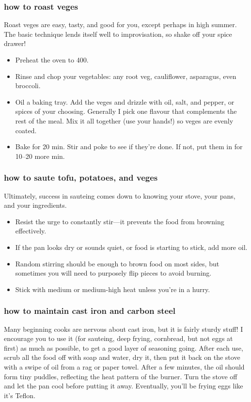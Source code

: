 \subsubsection{how to roast veges}
Roast veges are easy, tasty, and good for you, except perhaps in high summer. The basic technique lends itself well to improvisation, so shake off your spice drawer!
  \begin{itemize}
  \item Preheat the oven to 400\0.
  \item Rinse and chop your vegetables: any root veg, cauliflower, asparagus, even broccoli.
  \item Oil a baking tray. Add the veges and drizzle with oil, salt, and pepper, or spices of your choosing. Generally I pick one flavour that complements the rest of the meal. Mix it all together (use your hands!) so veges are evenly coated.
  \item Bake for 20 min. Stir and poke to see if they're done. If not, put them in for 10--20 more min.
  \end{itemize}

\subsubsection{how to saute tofu, potatoes, and veges}
Ultimately, success in sauteing comes down to knowing your stove, your pans, and your ingredients.
  \begin{itemize}
    \item Resist the urge to constantly stir---it prevents the food from browning effectively.
  \item If the pan looks dry or sounds quiet, or food is starting to stick, add more oil.
  \item Random stirring should be enough to brown food on most sides, but sometimes you will need to purposely flip pieces to avoid burning.
  \item Stick with medium or medium-high heat unless you're in a hurry.
  \end{itemize}

\subsubsection{how to maintain cast iron and carbon steel}
Many beginning cooks are nervous about cast iron, but it is fairly sturdy stuff! I encourage you to use it (for sauteing, deep frying, cornbread, but not eggs at first) as much as possible, to get a good layer of seasoning going. After each use, scrub all the food off with soap and water, dry it, then put it back on the stove with a swipe of oil from a rag or paper towel. After a few minutes, the oil should form tiny puddles, reflecting the heat pattern of the burner. Turn the stove off and let the pan cool before putting it away. Eventually, you'll be frying eggs like it's Teflon.

